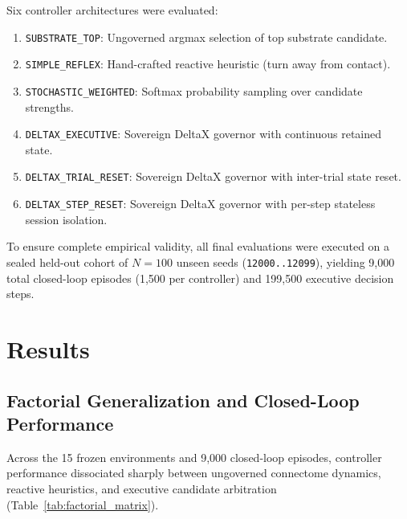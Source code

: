 \documentclass[10pt,letterpaper]{article}
\begin{document}
Six controller architectures were evaluated:
\begin{enumerate}
    \item \texttt{SUBSTRATE\_TOP}: Ungoverned argmax selection of top substrate candidate.
    \item \texttt{SIMPLE\_REFLEX}: Hand-crafted reactive heuristic (turn away from contact).
    \item \texttt{STOCHASTIC\_WEIGHTED}: Softmax probability sampling over candidate strengths.
    \item \texttt{DELTAX\_EXECUTIVE}: Sovereign DeltaX governor with continuous retained state.
    \item \texttt{DELTAX\_TRIAL\_RESET}: Sovereign DeltaX governor with inter-trial state reset.
    \item \texttt{DELTAX\_STEP\_RESET}: Sovereign DeltaX governor with per-step stateless session isolation.
\end{enumerate}

To ensure complete empirical validity, all final evaluations were executed on a sealed held-out cohort of $N = 100$ unseen seeds (\texttt{12000..12099}), yielding 9,000 total closed-loop episodes (1,500 per controller) and 199,500 executive decision steps.

\section{Results}

\subsection{Factorial Generalization and Closed-Loop Performance}

Across the 15 frozen environments and 9,000 closed-loop episodes, controller performance dissociated sharply between ungoverned connectome dynamics, reactive heuristics, and executive candidate arbitration (Table~\ref{tab:factorial_matrix}).
\end{document}
